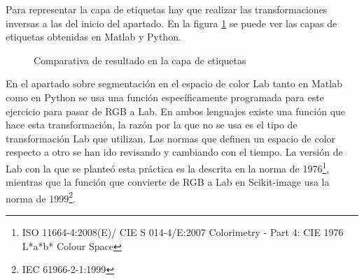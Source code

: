 Para representar la capa de etiquetas hay que realizar las transformaciones inversas a las del inicio del apartado. En la figura \ref{comprgb} se puede ver las capas de etiquetas obtenidas en Matlab y Python. \\

\begin{figure}[!tbp]
  \centering
  \hfill
  \caption{Comparativa de resultado en la capa de etiquetas}
  \label{comprgb}
\end{figure}

En el apartado sobre segmentación en el espacio de color Lab tanto en Matlab como en Python se usa una función específicamente programada para este ejercicio para pasar de RGB a Lab. En ambos lenguajes existe una función que hace esta transformación, la razón por la que no se usa es el tipo de transformación Lab que utilizan. Las normas que definen un espacio de color respecto a otro se han ido revisando y cambiando con el tiempo. La versión de Lab con la que se planteó esta práctica es la descrita en la norma de 1976\footnote{ISO 11664-4:2008(E)/ CIE S 014-4/E:2007 Colorimetry - Part 4: CIE 1976 L*a*b* Colour Space}, mientras que la función que convierte de RGB a Lab en Scikit-image usa la norma de 1999\footnote{IEC 61966-2-1:1999}.\\


